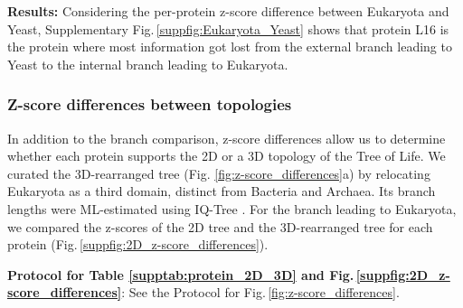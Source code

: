 \begin{appendices}
\medskip

\noindent \textbf{Results:} Considering the per-protein z-score difference between Eukaryota and Yeast, Supplementary Fig.\,\ref{suppfig:Eukaryota_Yeast} shows that protein L16 is the protein where most information got lost from the external branch leading to Yeast to the internal branch leading to Eukaryota.

\bigskip

\newpage
\subsubsection{Z-score differences between topologies}\label{suppsec:2DT_topology_zscore_diffs}


In addition to the branch comparison, z-score differences allow us to determine whether each protein supports the 2D or a 3D topology of the Tree of Life. We curated the 3D-rearranged tree (Fig. \ref{fig:z-score_differences}a) by relocating Eukaryota as a third domain, distinct from Bacteria and Archaea. Its branch lengths were ML-estimated using IQ-Tree . For the branch leading to Eukaryota, we compared the z-scores of the 2D tree and the 3D-rearranged tree for each protein (Fig.\,\ref{suppfig:2D_z-score_differences}).

\medskip

\noindent  \textbf{Protocol for  Table \ref{supptab:protein_2D_3D} and Fig.\,\ref{suppfig:2D_z-score_differences}}: See the Protocol for Fig.\,\ref{fig:z-score_differences}.


\end{appendices}
